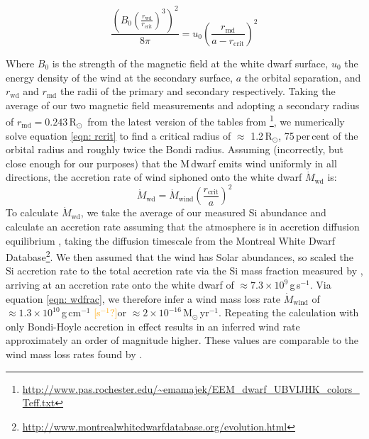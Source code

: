 \documentclass[fleqn,usenatbib]{mnras}
\newcommand{\Msun}{\mbox{$\mathrm{M}_{\odot}$}}
\newcommand{\Rsun}{\mbox{$\mathrm{R}_{\odot}$}}
\newcommand{\bgc}[1]{\textcolor{orange}{[#1]}}
\begin{document}
\newcommand{\D}{\displaystyle}
\begin{equation}
    \label{eqn: rcrit}
\frac{\left(B_0 \left(\frac{\D r_{\mathrm{wd}}}{\D r_{\mathrm{crit}}}\right)^3\right)^2}{8\pi} = u_0\left(\frac{r_{\mathrm{md}}}{a-r_{\mathrm{crit}}}\right)^2 
\end{equation}

Where $B_0$ is the strength of the magnetic field at the white dwarf surface, $u_0$ the energy density of the wind at the secondary surface, $a$ the orbital separation, and $r_{\mathrm{wd}}$ and $r_{\mathrm{md}}$ the radii of the primary and secondary respectively. Taking the average of our two magnetic field measurements and adopting a secondary radius of $r_{\mathrm{md}}=0.243$\,\Rsun\ from the latest version of the tables from \citet{pecaut+mamajek13-1}\footnote{\url{http://www.pas.rochester.edu/~emamajek/EEM_dwarf_UBVIJHK_colors_Teff.txt}}, we numerically solve equation \ref{eqn: rcrit} to find a critical radius of $\approx$ 1.2\,\Rsun, 75\,per\,cent of the orbital radius and roughly twice the Bondi radius. Assuming (incorrectly, but close enough for our purposes) that the M\,dwarf emits wind uniformly in all directions, the accretion rate of wind siphoned onto the white dwarf $\dot{M}_{\mathrm{wd}}$ is:
\begin{equation}
    \label{eqn: wdfrac}
\dot{M}_{\mathrm{wd}} = \dot{M}_{\mathrm{wind}} \left(\frac{r_{\mathrm{crit}}}{a}\right)^2      
\end{equation}
To calculate $\dot{M}_{\mathrm{wd}}$, we take the average of our measured Si abundance and calculate an accretion rate assuming that the atmosphere is in accretion diffusion equilibrium \citep{koester10-1}, taking the diffusion timescale from the Montreal White Dwarf Database\footnote{\url{http://www.montrealwhitedwarfdatabase.org/evolution.html}}. We then assumed that the wind has Solar abundances, so scaled the Si accretion rate to the total accretion rate via the Si mass fraction measured by \citet{asplundetal09-1}, arriving at an accretion rate onto the white dwarf of $\approx7.3\times10^9$\,g\,s$^{-1}$. Via equation \ref{eqn: wdfrac}, we therefore infer a wind mass loss rate $\dot{M}_{\mathrm{wind}}$ of $\approx1.3\times10^{10}$\,g\,cm$^{-1}$ \bgc{s$^{-1}$?}or $\approx2\times10^{-16}$\,\Msun\,yr$^{-1}$. Repeating the calculation with only Bondi-Hoyle accretion in effect results in an inferred wind rate approximately an order of magnitude higher. These values are comparable to the wind mass loss rates found by \citep{debes06-1}.
\end{document}
